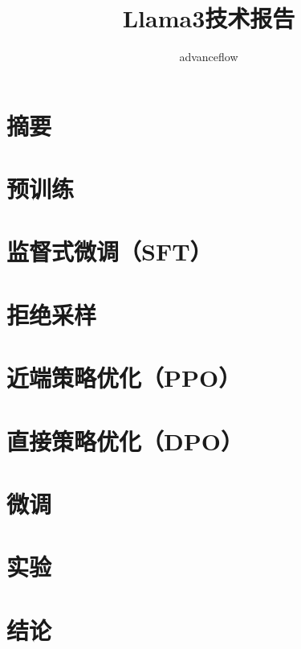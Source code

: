 \documentclass[lang=cn,a4paper]{paper}
\title{Llama3技术报告}
\author{advanceflow}
\begin{document}
\maketitle

\begin{abstract}

\end{abstract}

\section{摘要}

\section{预训练}
\section{监督式微调（SFT）}
\section{拒绝采样}
\section{近端策略优化（PPO）}
\section{直接策略优化（DPO）}
\section{微调}
\section{实验}
\section{结论}



\printbibliography

\end{document}
